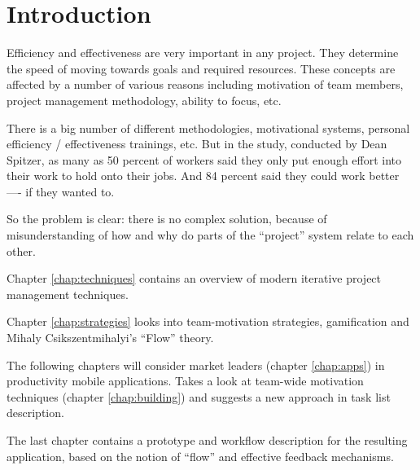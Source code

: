 \chapter*{Introduction}


Efficiency and effectiveness are very important in any project. They determine the speed of moving towards goals and required resources. These concepts are affected by a number of various reasons including motivation of team members, project management methodology, ability to focus, etc.

There is a big number of different methodologies, motivational systems, personal efficiency / effectiveness trainings, etc. But in the study, conducted by Dean Spitzer, as many as 50 percent of workers said they only put enough effort into their work to hold onto their jobs. And 84 percent said they could work better —- if they wanted to. \cite{spitzer}

So the problem is clear: there is no complex solution, because of misunderstanding of how and why do parts of the ``project'' system relate to each other.

Chapter \ref{chap:techniques} contains an overview of modern iterative project management techniques.

Chapter \ref{chap:strategies} looks into team-motivation strategies, gamification and Mihaly Csikszentmihalyi's ``Flow'' theory.

The following chapters will consider market leaders (chapter \ref{chap:apps}) in productivity mobile applications. Takes a look at team-wide motivation techniques (chapter \ref{chap:building}) and suggests a new approach in task list description.

The last chapter contains a prototype and workflow description for the resulting application, based on the notion of ``flow'' and effective feedback mechanisms.